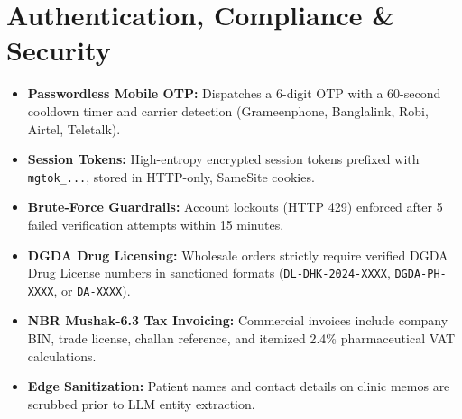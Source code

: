 \documentclass[10pt,a4paper]{article}
\begin{document}
\section{Authentication, Compliance \& Security}
\begin{itemize}[leftmargin=*]
    \item \textbf{Passwordless Mobile OTP:} Dispatches a 6-digit OTP with a 60-second cooldown timer and carrier detection (Grameenphone, Banglalink, Robi, Airtel, Teletalk).
    \item \textbf{Session Tokens:} High-entropy encrypted session tokens prefixed with \texttt{mgtok\_...}, stored in HTTP-only, SameSite cookies.
    \item \textbf{Brute-Force Guardrails:} Account lockouts (HTTP 429) enforced after 5 failed verification attempts within 15 minutes.
    \item \textbf{DGDA Drug Licensing:} Wholesale orders strictly require verified DGDA Drug License numbers in sanctioned formats (\texttt{DL-DHK-2024-XXXX}, \texttt{DGDA-PH-XXXX}, or \texttt{DA-XXXX}).
    \item \textbf{NBR Mushak-6.3 Tax Invoicing:} Commercial invoices include company BIN, trade license, challan reference, and itemized 2.4\% pharmaceutical VAT calculations.
    \item \textbf{Edge Sanitization:} Patient names and contact details on clinic memos are scrubbed prior to LLM entity extraction.
\end{itemize}

\end{document}
